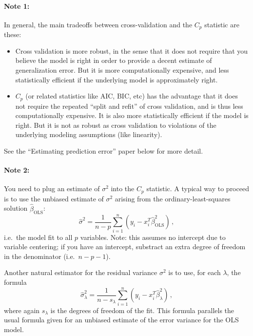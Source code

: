 \documentclass{article}
\begin{document}
\begin{enumerate}[(A)]
\paragraph{Note 1:} In general, the main tradeoffs between cross-validation and the $C_p$ statistic are these:
\begin{itemize}
\item  Cross validation is more robust, in the sense that it does not require that you believe the model is right in order to provide a decent estimate of generalization error.  But it is more computationally expensive, and less statistically efficient if the underlying model is approximately right.
\item $C_p$ (or related statistics like AIC, BIC, etc) has the advantage that it does not require the repeated ``split and refit'' of cross validation, and is thus less computationally expensive.  It is also more statistically efficient if the model is right.  But it is not as robust as cross validation to violations of the underlying modeling assumptions (like linearity).
\end{itemize}
See the ``Estimating prediction error'' paper below for more detail.

\paragraph{Note 2:} You need to plug an estimate of $\sigma^2$ into the $C_p$ statistic.  A typical way to proceed is to use the unbiased estimate of $\sigma^2$ arising from the ordinary-least-squares solution $\hat \beta_{\mathrm{OLS}}$:
$$
\hat{\sigma}^2 = \frac{1}{n - p} \sum_{i=1}^n (y_i - x_i^T \hat \beta_{\mathrm{OLS}}^2) \, ,
$$
i.e.~the model fit to all $p$ variables.  Note: this assumes no intercept due to variable centering; if you have an intercept, substract an extra degree of freedom in the denominator (i.e.~$n-p-1$).

Another natural estimator for the residual variance $\sigma^2$ is to use, for each $\lambda$, the formula
$$
\hat{\sigma}^2_{\lambda} = \frac{1}{n - s_{\lambda}} \sum_{i=1}^n (y_i - x_i^T \hat \beta_{\lambda}^2) \, ,
$$
where again $s_{\lambda}$ is the degrees of freedom of the fit.  This formula parallels the usual formula given for an unbiased estimate of the error variance for the OLS model.


\end{enumerate}
\end{document}
